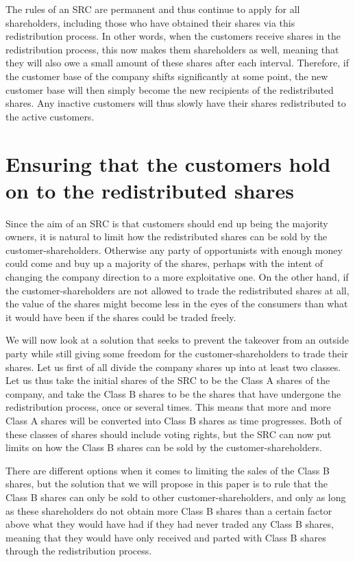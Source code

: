 \documentclass{article}
\begin{document}
The rules of an SRC are permanent and thus continue to apply for all shareholders, including those who have obtained their shares via this redistribution process. In other words, when the customers receive shares in the redistribution process, this now makes them shareholders as well, meaning that they will also owe a small amount of these shares after each interval. 
Therefore, if the customer base of the company shifts significantly at some point, the new customer base will then simply become the new recipients of the redistributed shares. Any inactive customers will thus slowly have their shares redistributed to the active customers.



\section{Ensuring that the customers hold on to the redistributed shares}


Since the aim of an SRC is that customers should end up being the majority owners, it is natural to limit how the redistributed shares can be sold by the customer-shareholders. Otherwise any party of opportunists with enough money could come and buy up a majority of the shares, perhaps with the intent of changing the company direction to a more exploitative one. On the other hand, if the customer-shareholders are not allowed to trade the redistributed shares at all, the value of the shares might become less in the eyes of the consumers than what it would have been if the shares could be traded freely. 

We will now look at a solution that seeks to prevent the takeover from an outside party while still giving some freedom for the customer-shareholders to trade their shares. Let us first of all divide the company shares up into at least two classes. Let us thus take the initial shares of the SRC to be the Class A shares of the company, and take the Class B shares to be the shares that have undergone the redistribution process, once or several times. This means that more and more Class A shares will be converted into Class B shares as time progresses. Both of these classes of shares should include voting rights, but the SRC can now put limits on how the Class B shares can be sold by the customer-shareholders. 

There are different options when it comes to limiting the sales of the Class B shares, but the solution that we will propose in this paper is to rule that the Class B shares can %
only be sold to other customer-shareholders, and only as long as these shareholders do not obtain more Class B shares than a certain factor above what they would have had if they had never traded any Class B shares, meaning that they would have only received and parted with Class B shares through the redistribution process. 
\end{document}

